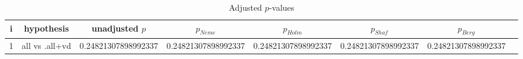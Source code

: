 \documentclass[a4paper,10pt]{article}
\begin{document}
\begin{landscape}
\begin{itemize}


\end{itemize}


\begin{table}[!htp]
\centering\tiny
\caption{Adjusted $p$-values}
\begin{tabular}{cccccccc}
i&hypothesis&unadjusted $p$&$p_{Neme}$&$p_{Holm}$&$p_{Shaf}$&$p_{Berg}$\\
\hline
1&all vs .all+vd&0.24821307898992337&0.24821307898992337&0.24821307898992337&0.24821307898992337&0.24821307898992337\\\hline
\end{tabular}
\end{table}

\end{landscape}
\end{document}
